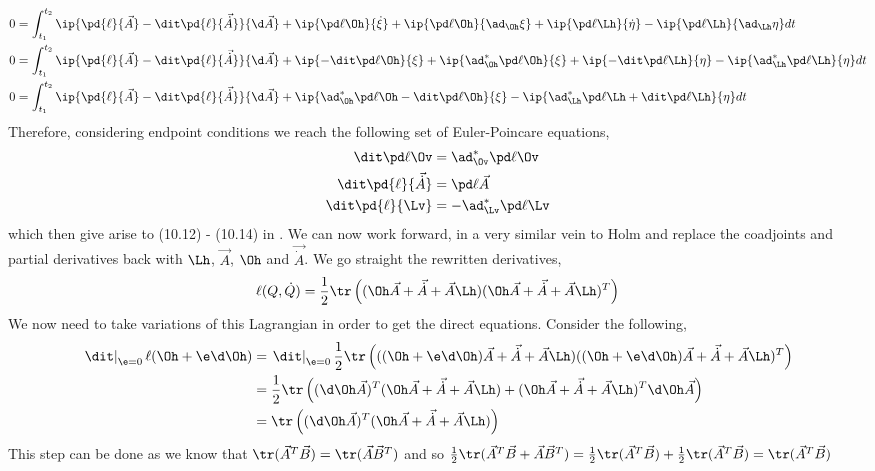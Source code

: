 \begin{align*}
  0 &= \int_{t_1}^{t_2} \ip{\pd{\ell}{\vec A} - \dit\pd{\ell}{\vec{\dot A}}}{\d \vec A} + \ip{\pd \ell \Oh}{\dot \xi} + \ip{\pd \ell \Oh}{\ad_{\Oh} \xi} + \ip{\pd \ell \Lh}{\dot \eta} - \ip{\pd \ell \Lh}{\ad_{\Lh} \eta}dt \\
  0 &= \int_{t_1}^{t_2} \ip{\pd{\ell}{\vec A} - \dit\pd{\ell}{\vec{\dot A}}}{\d \vec A} + \ip{-\dit\pd \ell \Oh}{\xi} + \ip{\ad^*_{\Oh} \pd \ell \Oh}{\xi} + \ip{-\dit \pd \ell \Lh}{\eta} - \ip{\ad^*_{\Lh} \pd \ell \Lh}{ \eta}dt \\
  0 &= \int_{t_1}^{t_2} \ip{\pd{\ell}{\vec A} - \dit\pd{\ell}{\vec{\dot A}}}{\d \vec A} + \ip{\ad^*_{\Oh} \pd \ell \Oh -\dit\pd \ell \Oh}{\xi} - \ip{\ad^*_{\Lh} \pd \ell \Lh + \dit \pd \ell \Lh}{ \eta}dt \\
\end{align*}
Therefore, considering endpoint conditions we reach the following set of Euler-Poincare equations,
\begin{align}
  \dit \pd \ell \Ov &= \ad^*_{\Ov} \pd \ell \Ov \\
  \dit \pd{\ell}{\vec{\dot A}} &= \pd \ell {\vec A} \\
  \dit \pd{\ell}{\Lv} &= -\ad^*_{\Lv} \pd \ell \Lv
\end{align}
which then give arise to (10.12) - (10.14) in \cite{holm_schmah_stoica_2009}. We can now work forward, in a very similar vein to Holm and replace the coadjoints and partial derivatives back with $\Lh$, $\vec A$, $\Oh$ and $\vec{\dot A}$. We go straight the rewritten derivatives,
$$ \ell(Q, \dot Q) = \frac{1}{2}\tr \left( (\Oh \vec A + \vec {\dot A} + \vec A\Lh)(\Oh \vec A + \vec {\dot A} + \vec A\Lh)^T \right) $$
We now need to take variations of this Lagrangian in order to get the direct equations. Consider the following,
\begin{align*}
  \left.\dit\right|_{\e = 0}\ell (\Oh + \e\d\Oh) &= \left.\dit\right|_{\e = 0} \frac{1}{2}\tr\left( ((\Oh + \e\d\Oh) \vec A + \vec {\dot A} + \vec A\Lh)((\Oh + \e\d\Oh) \vec A + \vec {\dot A} + \vec A\Lh)^T \right) \\
  &= \frac{1}{2}\tr\left( (\d\Oh \vec A)^T (\Oh \vec A + \vec {\dot A} + \vec A\Lh) + (\Oh \vec A + \vec {\dot A} + \vec A\Lh)^T \d\Oh \vec A \right)\\
  &= \tr\left( (\d\Oh \vec A)^T (\Oh \vec A + \vec {\dot A} + \vec A\Lh)  \right)
\end{align*}
This step can be done as we know that $\tr(\vec A^T\vec B) = \tr(\vec A\vec B^T)$ and so $\frac{1}{2}\tr(\vec A^T\vec B + \vec A\vec B^T) = \frac{1}{2}\tr(\vec A^T\vec B) + \frac{1}{2}\tr(\vec A^T\vec B) = \tr(\vec A^T\vec B)$
